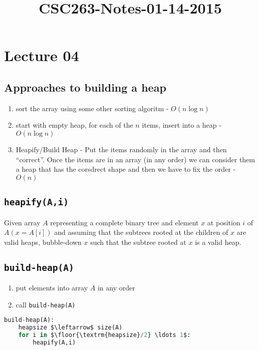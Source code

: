 



\title{CSC263-Notes-01-14-2015}



\section*{Lecture 04}

\subsection*{Approaches to building a heap}

\begin{enumerate}[label={(\Alph*)}]
	\item sort the array using some other sorting algoritm - $O(n\log n)$
	\item start with empty heap, for each of the $n$ items, insert into a heap - $O(n\log n)$
	\item Heapify/Build Heap - Put the items randomly in the array and then ``correct''. Once the items are in an array (in any order) we can consider them a heap that has the corsdrect shape and then we have to fix the order - $O(n)$
\end{enumerate}

\subsection*{\texttt{heapify(A,i)}}

\noindent Given array $A$ representing a complete binary tree and element $x$ at position $i$ of $A (x=A[i])$ and assuming that the subtrees rooted at the children of $x$ are valid heaps, bubble-down $x$ such that the subtree rooted at $x$ is a valid heap.

\subsection*{\texttt{build-heap(A)}}

\begin{enumerate}[label={(\arabic*)}]
	\item put elements into array $A$ in any order
	\item call \texttt{build-heap(A)}
\end{enumerate}

\begin{lstlisting}[language=Python,mathescape]
build-heap(A):
	heapsize $\leftarrow$ size(A)
	for i in $\floor{\textrm{heapsize}/2} \ldots 1$:
		heapify(A,i)
\end{lstlisting}

